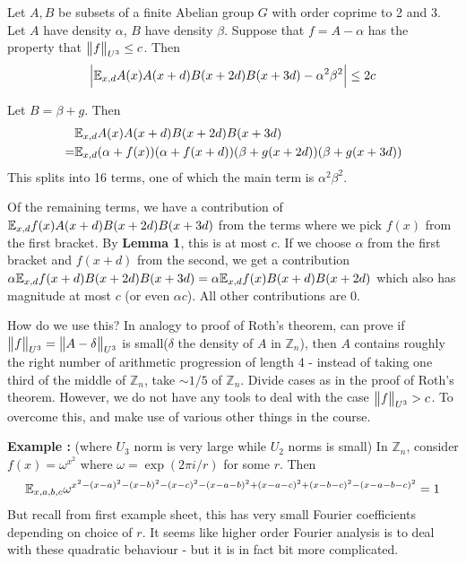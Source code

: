 \documentclass[12pt,a4paper]{report}
\newenvironment{proof}
{\begin{changemargin}{1cm}{0.5cm}
	}%
	{\end{changemargin}
}
\begin{document}
 Let $A,B$ be subsets of a finite Abelian group $G$ with order coprime to 2 and 3. Let $A$ have density $\alpha$, $B$ have density $\beta$. Suppose that $f=A-\alpha$ has the property that $\bigl\lVert f\bigr\rVert_{U^3} \leq c$. Then
\begin{align*}
\Big| \mathbb{E}_{x,d} A(x) A(x+d) B(x+2d) B(x+3d) - \alpha^2 \beta^2 \Big| \leq 2c
\end{align*}
\begin{proof}
\pf Let $B = \beta + g$. Then
\begin{align*}
&\mathbb{E}_{x,d} A(x) A(x+d) B(x+2d) B(x+3d) \\
=& \mathbb{E}_{x,d} (\alpha + f(x)) (\alpha + f(x+d)) (\beta + g(x+2d))(\beta + g(x+3d)) 
\end{align*}
This splits into 16 terms, one of which the main term is $\alpha^2 \beta^2$.

\quad Of the remaining terms, we have a contribution of $\mathbb{E}_{x,d} f(x)A(x+d) B(x+2d) B(x+3d)$ from the terms where we pick $f(x)$ from the first bracket. By \textbf{Lemma 1}, this is at most $c$. If we choose $\alpha$ from the first bracket and $f(x+d)$ from the second, we get a contribution $\alpha \mathbb{E}_{x,d} f(x+d) B(x+2d) B(x+3d) = \alpha \mathbb{E}_{x,d} f(x) B(x+d) B(x+2d)$ which also has magnitude at most $c$ (or even $\alpha c$). All other contributions are 0. 

\eop
\end{proof}
\s

How do we use this? In analogy to proof of Roth's theorem, can prove if $\bigl\lVert f\bigr\rVert_{U^3} = \bigl\lVert A-\delta\bigr\rVert_{U^3}$ is small($\delta$ the density of $A$ in $\mathbb{Z}_n$), then $A$ contains roughly the right number of arithmetic progression of length 4 - instead of taking one third of the middle of $\mathbb{Z}_n$, take $\sim 1/5$ of $\mathbb{Z}_n$. Divide cases as in the proof of Roth's theorem. However, we do not have any tools to deal with the case $\bigl\lVert f\bigr\rVert_{U^3} > c$. To overcome this, and make use of various other things in the course.
\s

\textbf{Example :} (where $U_3$ norm is very large while $U_2$ norms is small) In $\mathbb{Z}_n$, consider $f(x) = \omega^{x^2}$ where $\omega = \exp(2\pi i /r)$ for some $r$. Then
\begin{align*}
\mathbb{E}_{x,a,b,c} \omega^{x^2 - (x-a)^2 - (x-b)^2 - (x-c)^2 - (x-a-b)^2  + (x-a-c)^2 + (x-b-c)^2 - (x-a-b-c)^2} = 1 
\end{align*}
But recall from first example sheet, this has very small Fourier coefficients depending on choice of $r$. It seems like higher order Fourier analysis is to deal with these quadratic behaviour - but it is in fact bit more complicated.
\s
\end{document}
